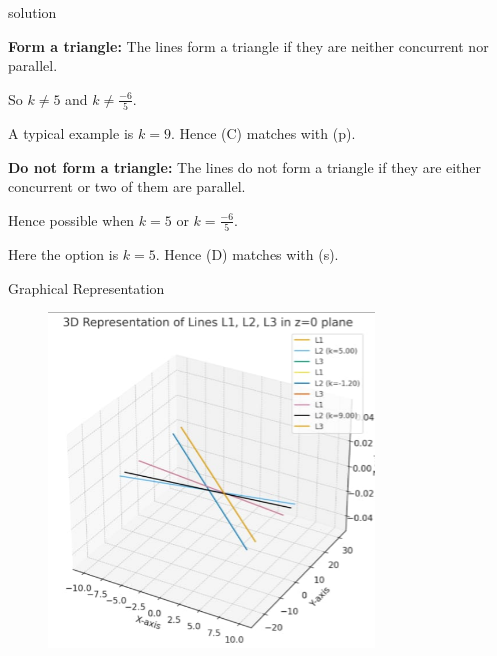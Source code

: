 \documentclass{beamer}
\begin{document}
\begin{frame}{solution}

\item \textbf{Form a triangle:} The lines form a triangle if they are neither concurrent nor parallel.

    So $k \neq 5$ and $k \neq \frac{-6}{5}$.

    A typical example is $k = 9$. Hence (C) matches with (p).

    \item \textbf{Do not form a triangle:} The lines do not form a triangle if they are either concurrent or two of them are parallel.

    Hence possible when $k = 5$ or $k = \frac{-6}{5}$.

    Here the option is $k = 5$. Hence (D) matches with (s).
    \end{frame}
    \begin{frame}{Graphical Representation}
   \begin{figure}[h!]
\centering
\includegraphics[width=0.6\linewidth]{fig4.13.1.png}
\end{figure}
\end{frame}
\end{document}
